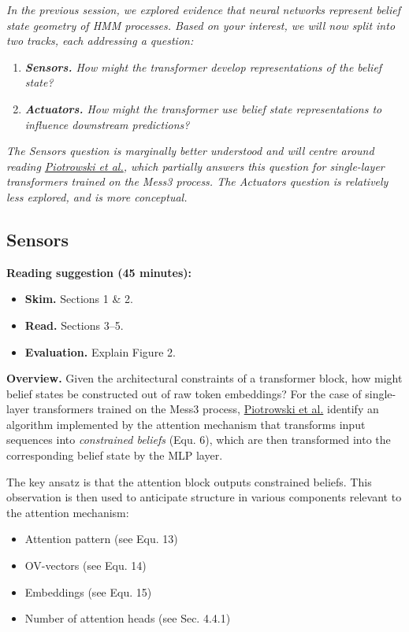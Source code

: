 \emph{In the previous session, we explored evidence that neural networks represent belief state geometry of HMM processes. Based on your interest, we will now split into two tracks, each addressing a question:}

\begin{enumerate}
\item
  \emph{\textbf{Sensors.} How might the transformer develop representations of the belief state?}
\item
  \emph{\textbf{Actuators.} How might the transformer use belief state representations to influence downstream predictions?}
\end{enumerate}

\emph{The Sensors question is marginally better understood and will centre around reading \href{https://arxiv.org/pdf/2502.01954}{Piotrowski et al.}, which partially answers this question for single-layer transformers trained on the Mess3 process. The Actuators question is relatively less explored, and is more conceptual.}

\subsection{Sensors }\label{sensors}

\textbf{Reading suggestion (45 minutes):}

\begin{itemize}
\item
  \textbf{Skim.} Sections 1 \& 2.
\item
  \textbf{Read.} Sections 3--5.
\item
  \textbf{Evaluation.} Explain Figure 2.
\end{itemize}

\textbf{Overview.} Given the architectural constraints of a transformer block, how might belief states be constructed out of raw token embeddings? For the case of single-layer transformers trained on the Mess3 process, \href{https://arxiv.org/pdf/2502.01954}{Piotrowski et al.} identify an algorithm implemented by the attention mechanism that transforms input sequences into \emph{constrained beliefs} (Equ. 6), which are then transformed into the corresponding belief state by the MLP layer.

The key ansatz is that the attention block outputs constrained beliefs. This observation is then used to anticipate structure in various components relevant to the attention mechanism:

\begin{itemize}
\item
  Attention pattern (see Equ. 13)
\item
  OV-vectors (see Equ. 14)
\item
  Embeddings (see Equ. 15)
\item
  Number of attention heads (see Sec. 4.4.1)
\end{itemize}

